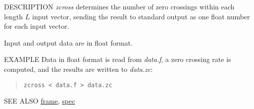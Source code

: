 \begin{synopsis}
\item[zcross] [ --l $L$ ] [ --n ] [ {\em infile} ]
\end{synopsis}

\begin{qsection}{DESCRIPTION}
{\em zcross} determines the number of zero crossings 
within each length $L$ input vector, 
sending the result to standard output 
as one float number for each input vector.

Input and output data are in float format.
\end{qsection}

\begin{options}
\end{options}

\begin{qsection}{EXAMPLE}
Data in float format is read from {\em data.f},
a zero crossing rate is computed,
and the results are written to {\em data.zc}:
\begin{quote}
  \verb!zcross < data.f > data.zc!
\end{quote}
\end{qsection}

\begin{qsection}{SEE ALSO}
\hyperlink{frame}{frame},
\hyperlink{spec}{spec}
\end{qsection}
